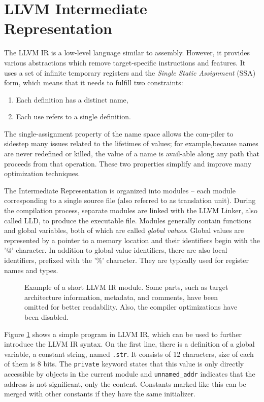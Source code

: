 \documentclass[
  digital, %
  table,   %
  twoside, %
  nolof,     %
  nolot,     %
]{fithesis3}
\theoremstyle{definition}
\begin{document}
\section{LLVM Intermediate Representation}
The LLVM IR is a low-level language similar to assembly. However, it provides various abstractions which remove target-specific instructions and features. It uses a set of infinite temporary registers and the \textit{Single Static Assignment} (SSA) form, which means that it needs to fulfill two constraints:

\begin{enumerate}
    \item Each definition has a distinct name,
    \item Each use refers to a single definition.
\end{enumerate}

 The  single-assignment  property  of  the  name  space  allows  the  com-piler to sidestep many issues related to the lifetimes of values; for example,because names are never redefined or killed, the value of a name is avail-able along any path that proceeds from that operation. These two properties simplify and improve many optimization techniques\cite{eng_comp}.

The Intermediate Representation is organized into modules -- each module corresponding to a single source file (also referred to as translation unit). During the compilation process, separate modules are linked with the LLVM Linker, also called LLD, to produce the executable file. Modules generally contain functions and global variables, both of which are called \textit{global values}. Global values are represented by a pointer to a memory location and their identifiers begin with the '@' character. In addition to global value identifiers, there are also local identifiers, prefixed with the '\%' character. They are typically used for register names and types. 

\begin{figure}
    
    \caption{Example of a short LLVM IR module. Some parts, such as target architecture information, metadata, and comments, have been omitted for better readability. Also, the compiler optimizations have been disabled.}
    \label{fig:ir_example}
\end{figure}

Figure \ref{fig:ir_example} shows a simple program in LLVM IR, which can be used to further introduce the LLVM IR syntax. On the first line, there is a definition of a global variable, a constant string, named \texttt{.str}. It consists of 12 characters, size of each of them is 8 bits. The \texttt{private} keyword states that this value is only directly accessible by objects in the current module and \texttt{unnamed\_addr} indicates that the address is not significant, only the content. Constants marked like this can be merged with other constants if they have the same initializer. 
\end{document}
